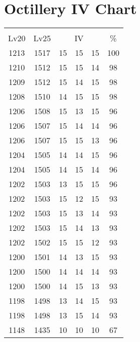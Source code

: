 \documentclass{article}%
\begin{document}
%
\normalsize%
\section{Octillery IV Chart}%
\label{sec:Octillery IV Chart}%
\renewcommand{\arraystretch}{1.5}%
\begin{tabular}{|c|c|c|c|c|c|}%
\hline%
\multicolumn{6}{|c|}{\textcolor{white}{ 
\linebreak{Octillery}
}%
\cellcolor{black}}\\%
\multicolumn{1}{|c}{Lv20}&\multicolumn{1}{c|}{Lv25}&\multicolumn{3}{c|}{IV}&\multicolumn{1}{|c|}{\%}\\%
\hline%
\rowcolor{color100}%
1213&1517&15&15&15&100\\%
\hline%
\rowcolor{color98}%
1210&1512&15&15&14&98\\%
\hline%
\rowcolor{color98}%
1209&1512&15&14&15&98\\%
\hline%
\rowcolor{color98}%
1208&1510&14&15&15&98\\%
\hline%
\rowcolor{color96}%
1206&1508&15&13&15&96\\%
\hline%
\rowcolor{color96}%
1206&1507&15&14&14&96\\%
\hline%
\rowcolor{color96}%
1206&1507&15&15&13&96\\%
\hline%
\rowcolor{color96}%
1204&1505&14&14&15&96\\%
\hline%
\rowcolor{color96}%
1204&1505&14&15&14&96\\%
\hline%
\rowcolor{color96}%
1202&1503&13&15&15&96\\%
\hline%
\rowcolor{color93}%
1202&1503&15&12&15&93\\%
\hline%
\rowcolor{color93}%
1202&1503&15&13&14&93\\%
\hline%
\rowcolor{color93}%
1202&1503&15&14&13&93\\%
\hline%
\rowcolor{color93}%
1202&1502&15&15&12&93\\%
\hline%
\rowcolor{color93}%
1200&1501&14&13&15&93\\%
\hline%
\rowcolor{color93}%
1200&1500&14&14&14&93\\%
\hline%
\rowcolor{color93}%
1200&1500&14&15&13&93\\%
\hline%
\rowcolor{color93}%
1198&1498&13&14&15&93\\%
\hline%
\rowcolor{color93}%
1198&1498&13&15&14&93\\%
\hline%
\rowcolor{color91}%
1148&1435&10&10&10&67\\%
\end{tabular}

%
\end{document}
